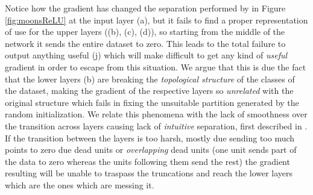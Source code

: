 Notice how the gradient has changed the separation performed by \ReLU in Figure \ref{fig:moonsReLU} at the input layer (a), but it fails to find a proper representation of use for the upper layers ((b), (c), (d)), so starting from the middle of the network it sends the entire dataset to zero. This leads to the total failure to output anything useful (j) which will make difficult to get any kind of \emph{useful} gradient in order to escape from this situation. We argue that this is due the fact that the lower layers (b) are breaking the \emph{topological structure} of the classes of the dataset, making the gradient of the respective layers so \emph{unrelated} with the original structure which fails in fixing the unsuitable partition generated by the random initialization. We relate this phenomena with the lack of smoothness over the transition across layers causing lack of \emph{intuitive} separation, first described in \cite{HauserAsok}. If the transition between the layers is too harsh, mostly due sending too much points to zero due dead units or \emph{overlapping} dead units (one unit sends part of the data to zero whereas the units following them send the rest) the gradient resulting will be unable to traspass the truncations and reach the lower layers which are the ones which are messing it.

